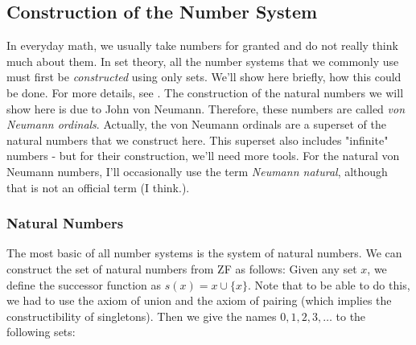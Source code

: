 




\subsection{Construction of the Number System}
In everyday math, we usually take numbers for granted and do not really think much about them. In set theory, all the number systems that we commonly use must first be \emph{constructed} using only sets. We'll show here briefly, how this could be done. For more details, see \cite{PDF_MathFAQ}. The construction of the natural numbers we will show here is due to John von Neumann. Therefore, these numbers are called \emph{von Neumann ordinals}. Actually, the von Neumann ordinals are a superset of the natural numbers that we construct here. This superset also includes "infinite" numbers - but for their construction, we'll need more tools. For the natural von Neumann numbers, I'll occasionally use the term \emph{Neumann natural}, although that is not an official term (I think.).





\subsubsection{Natural Numbers}
The most basic of all number systems is the system of natural numbers. We can construct the set of natural numbers from ZF as follows: Given any set $x$, we define the successor function as $s(x) = x \cup \{ x \}$. Note that to be able to do this, we had to use the axiom of union and the axiom of pairing (which implies the constructibility of singletons). Then we give the names $0,1,2,3,\ldots$ to the following sets:

